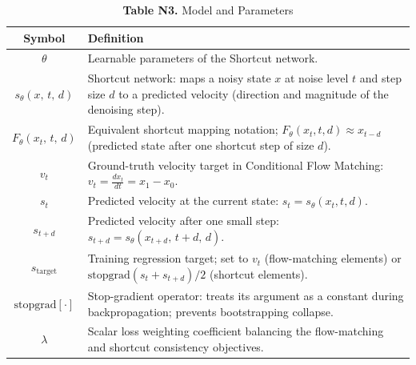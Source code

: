 \begin{table}[h]
\centering
\caption*{\textbf{Table N3.} Model and Parameters}
\begin{tabular}{@{} c p{10cm} @{}}
\toprule
\textbf{Symbol} & \textbf{Definition} \\
\midrule
$\theta$
  & Learnable parameters of the Shortcut network. \\
$s_\theta(x,\,t,\,d)$
  & Shortcut network: maps a noisy state $x$ at noise level $t$ and
    step size $d$ to a predicted velocity (direction and magnitude of
    the denoising step). \\
$F_\theta(x_t,\,t,\,d)$
  & Equivalent shortcut mapping notation;
    $F_\theta(x_t, t, d) \approx x_{t-d}$ (predicted state after one
    shortcut step of size $d$). \\
$v_t$
  & Ground-truth velocity target in Conditional Flow Matching:
    $v_t = \frac{dx_t}{dt} = x_1 - x_0$. \\
$s_t$
  & Predicted velocity at the current state: $s_t = s_\theta(x_t, t, d)$. \\
$s_{t+d}$
  & Predicted velocity after one small step:
    $s_{t+d} = s_\theta(x_{t+d},\, t+d,\, d)$. \\
$s_{\mathrm{target}}$
  & Training regression target; set to $v_t$ (flow-matching elements)
    or $\mathrm{stopgrad}(s_t + s_{t+d})/2$ (shortcut elements). \\
$\mathrm{stopgrad}[\cdot]$
  & Stop-gradient operator: treats its argument as a constant during
    backpropagation; prevents bootstrapping collapse. \\
$\lambda$
  & Scalar loss weighting coefficient balancing the flow-matching
    and shortcut consistency objectives. \\
\bottomrule
\end{tabular}
\end{table}

